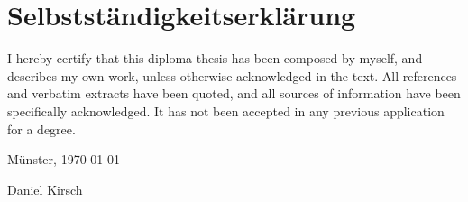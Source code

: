 \chapter{Selbstständigkeitserklärung}

\setlength{\parindent}{0mm}
I hereby certify that this diploma thesis has been composed by myself, and describes my own work, unless otherwise acknowledged in the text. All references and verbatim extracts have been quoted, and all sources of information have been specifically acknowledged. It has not been accepted in any previous application for a degree.\\

\vspace{20mm}

Münster, \today\\

\vspace{15mm}

Daniel Kirsch\\